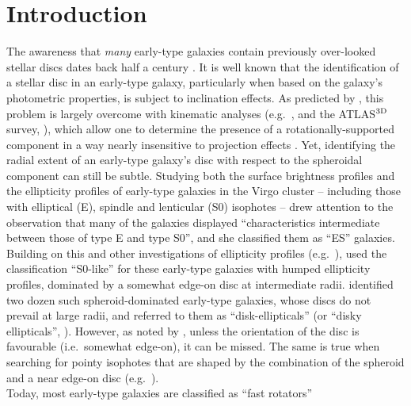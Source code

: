 \documentclass[useAMS,usenatbib,article]{mnras}
\begin{document}
\section{Introduction}
\label{sec:int}
The awareness that \emph{many} early-type galaxies contain previously over-looked stellar discs dates back half a century 
\citep{liller1966,stromstrom1978,michard1984,djorgovski1985,jedrzejewski1987,BenderMoellenhoff1987,
carter1987,capaccioli1987,capaccioli1988}. 
It is well known that 
the identification of a stellar disc in an early-type galaxy, particularly when based on the galaxy's photometric properties, 
is subject to inclination effects. 
As predicted by \cite{carter1987}, this problem is largely overcome with kinematic analyses 
(e.g.~\citealt{franx1989,nieto1991,rixwhite1992,cinzanovandermarel1993,donofrio1995,graham1998fornax}, 
and the ATLAS$^{\rm 3D}$ survey, \citealt{cappellari2011}), 
which allow one to determine the presence of a rotationally-supported component 
in a way nearly insensitive to projection effects \citep{mcelroy1983,cappellari2007,emsellem2007}. 
Yet, identifying the radial extent of an early-type galaxy's disc with respect to the spheroidal component can still be subtle. 
Studying both the surface brightness profiles and the ellipticity profiles 
of early-type galaxies in the Virgo cluster -- including those with elliptical (E), spindle and lenticular (S0) isophotes -- 
\cite{liller1966} drew attention to the observation that many of the galaxies displayed 
``characteristics intermediate between those of type E and type S0'', 
and she classified them as ``ES'' galaxies.  
Building on this and other investigations of ellipticity profiles (e.g.~\citealt{stromstrom1978,ditullio1979}), 
\cite{michard1984} used the classification ``S0-like'' for these early-type galaxies with humped ellipticity profiles, 
dominated by a somewhat edge-on disc at intermediate radii.  
\cite{nieto1988} identified two dozen such spheroid-dominated early-type galaxies, 
whose discs do not prevail at large radii, 
and referred to them as ``disk-ellipticals'' (or ``disky ellipticals'', \citealt{simienmichard1990}).   
However, as noted by \cite{nieto1988}, unless the orientation of the disc is favourable 
(i.e.~somewhat edge-on), it can be missed.  
The same is true when searching for pointy isophotes that are shaped by the combination of the spheroid and a near edge-on disc 
(e.g.~\citealt{carter1978,carter1987,jedrzejewski1987,ebneter1987,BenderMoellenhoff1987,bender1988,bijaoui1989}). \\
Today, most early-type galaxies are classified as ``fast rotators'' 
\end{document}
